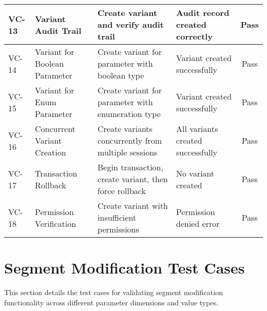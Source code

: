 \begin{longtable}{|p{0.7cm}|p{3.5cm}|p{3.7cm}|p{3.7cm}|c|}
\hline
VC-13 & Variant Audit Trail & Create variant and verify audit trail & Audit record created correctly & Pass \\
\hline
VC-14 & Variant for Boolean Parameter & Create variant for parameter with boolean type & Variant created successfully & Pass \\
\hline
VC-15 & Variant for Enum Parameter & Create variant for parameter with enumeration type & Variant created successfully & Pass \\
\hline
VC-16 & Concurrent Variant Creation & Create variants concurrently from multiple sessions & All variants created successfully & Pass \\
\hline
VC-17 & Transaction Rollback & Begin transaction, create variant, then force rollback & No variant created & Pass \\
\hline
VC-18 & Permission Verification & Create variant with insufficient permissions & Permission denied error & Pass \\
\hline
\end{longtable}

\section{Segment Modification Test Cases}
\label{sec:segment-modification-tests}

This section details the test cases for validating segment modification functionality across different parameter dimensions and value types.

